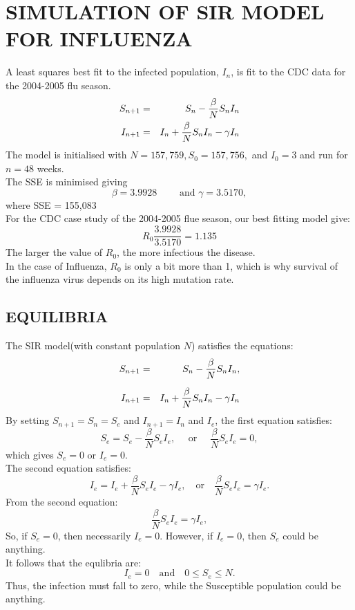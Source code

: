 \documentclass[12pt]{report}
\newcommand{\sps}{\\[0.2cm]}
\newcommand{\NI}{\noindent}
\begin{document}
	\section{SIMULATION OF SIR MODEL FOR INFLUENZA}
	A least squares best fit to the infected population, $I_n$, is fit to the CDC data for the 2004-2005 flu season.
	\begin{eqnarray}
		S_{n+1} &=& S_n - \frac{\beta}{N}S_nI_n\notag\\
		I_{n+1} &=& I_n + \frac{\beta}{N}S_nI_n - \gamma I_n\notag
	\end{eqnarray}
	The model is initialised with $N=157,759, S_0=157,756,$ and $I_0=3$ and run for $n=48$ weeks.\sps
	The SSE is minimised giving
	\begin{equation*}
		\beta = 3.9928 \qquad \text{ and } \gamma=3.5170,
	\end{equation*}
	where SSE = 155,083\sps
	For the CDC case study of the 2004-2005 flue season, our best fitting model give:
	\begin{equation*}
		R_0 \frac{3.9928}{3.5170} = 1.135
	\end{equation*}
	The larger the value of $R_0$, the more infectious the disease.\sps
	
	\NI In the case of Influenza, $R_0$ is only a bit more than 1, which is why survival of the influenza virus depends on its high mutation rate.\sps
	
	\subsection{EQUILIBRIA}
	The SIR model(with constant population $N$) satisfies the equations:
	\begin{eqnarray}
		S_{n+1} &=& S_n - \frac{\beta}{N}S_nI_n,\notag\sps
		I_{n+1} &=& I_n + \frac{\beta}{N}S_nI_n - \gamma I_n\notag
	\end{eqnarray}
	By setting $S_{n+1} = S_n = S_e$ and $I_{n+1}=I_n$ and $I_e$, the first equation satisfies:
	\begin{equation*}
		S_e = S_e - \frac{\beta}{N}S_eI_e, \quad \text{ or } \quad \frac{\beta}{N}S_eI_e = 0,
	\end{equation*}
	which gives $S_e = 0$ or $I_e = 0$.\sps
	The second equation satisfies:
	\begin{equation*}
		I_e = I_e + \frac{\beta}{N}S_eI_e - \gamma I_e, \quad \text{or}\quad \frac{\beta}{N}S_eI_e = \gamma I_e.
	\end{equation*}
	From the second equation:
	\begin{equation*}
		\frac{\beta}{N}S_eI_e = \gamma I_e,
	\end{equation*}
	So, if $S_e=0$, then necessarily $I_e=0$. However, if $I_e =0$, then $S_e$ could be anything.\sps
	It follows that the equlibria are:
	\begin{equation*}
		I_e=0 \quad \text{and}\quad 0 \leq S_e \leq N.
	\end{equation*}
	Thus, the infection must fall to zero, while the Susceptible population could be anything.\sps
	
\end{document}
